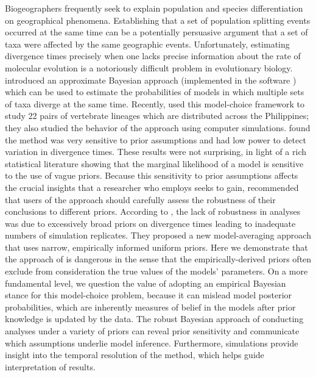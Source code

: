 Biogeographers frequently seek to explain population and species
differentiation on geographical phenomena.
Establishing that a set of population splitting events occurred
at the same time can be a potentially persuasive argument that a set of taxa
were affected by the same geographic events.
Unfortunately, estimating divergence times precisely when one lacks
precise information about the rate of molecular evolution is a notoriously
difficult problem in evolutionary biology.
\citet{Huang2011} introduced an approximate Bayesian approach (implemented
in the software \msb) which can be used to estimate the probabilities of
models in which multiple sets of taxa diverge at the same time. 
Recently, \citet{Oaks2012} used this model-choice framework to 
study 22 pairs of vertebrate lineages which are distributed across
the Philippines; they also studied the behavior of the \msb approach
using computer simulations.
\citet{Oaks2012} found the method was very sensitive to prior assumptions and
had low power to detect variation in divergence times.
These results were not surprising, in light of a rich statistical literature
showing that the marginal likelihood of a model is sensitive to the
use of vague priors.
Because this sensitivity to prior assumptions affects the crucial insights 
that a researcher who employs \msb seeks to gain, \citet{Oaks2012} recommended
that users of the approach should carefully assess the robustness of their 
conclusions to different priors.
According to \citet{Hickerson2013}, the lack of robustness in \msb analyses
was due to excessively broad priors on divergence times leading to 
inadequate numbers of simulation replicates.
They proposed a new model-averaging approach that uses narrow, empirically
informed uniform priors.
Here we demonstrate that the approach of \citet{Hickerson2013} is
dangerous in the sense that the empirically-derived priors often
exclude from consideration the true values of the models' parameters.
On a more fundamental level, we question the value of adopting an empirical
Bayesian stance for this model-choice problem, because it can mislead model
posterior probabilities, which are inherently measures of belief in the
models after prior knowledge is updated by the data.
The robust Bayesian approach of conducting analyses under a variety
of priors can reveal prior sensitivity and communicate which assumptions
underlie model inference.
Furthermore, simulations provide insight into the temporal resolution of the
method, which helps guide interpretation of results.
